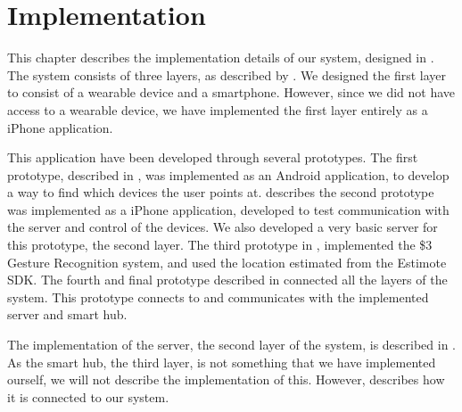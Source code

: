 \chapter{Implementation}\label{chap:implementation}
%
This chapter describes the implementation details of our system, 
designed in . 
The system consists of three layers, as described by .
We designed the first layer to consist of a wearable device and a smartphone. 
However, since we did not have access to a wearable device, 
we have implemented the first layer entirely as a iPhone application. 

This application have been developed through several prototypes. 
The first prototype, described in , was implemented as an Android application, 
to develop a way to find which devices the user points at. 
 describes the second prototype was implemented as a iPhone application,
developed to test communication with the server and control of the devices. 
We also developed a very basic server for this prototype, \ie the second layer. 
The third prototype in , 
implemented the \$3 Gesture Recognition system,
and used the location estimated from the Estimote SDK. 
The fourth and final prototype described in  connected all the layers of the system. 
This prototype connects to and communicates with the implemented server and smart hub. 

The implementation of the server, \ie the second layer of the system, 
is described in . 
As the smart hub, the third layer, is not something that we have implemented ourself, 
we will not describe the implementation of this.
However,  describes how it is connected to our system. 


\FloatBarrier

\FloatBarrier

\FloatBarrier

\FloatBarrier
